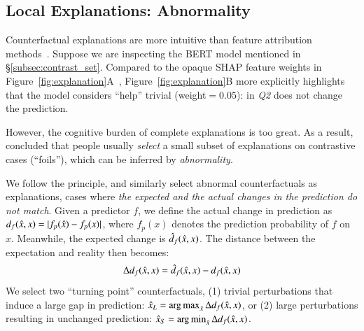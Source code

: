 \subsection{Local Explanations: Abnormality}
Counterfactual explanations are more intuitive than feature attribution methods~\cite{miller}.
Suppose we are inspecting the \qqp BERT model mentioned in \S\ref{subsec:contrast_set}.
Compared to the opaque SHAP feature weights in Figure~\ref{fig:explanation}A~\cite{NIPS2017_7062}, Figure~\ref{fig:explanation}B more explicitly highlights that the model considers ``help'' trivial (weight$=0.05$): 
 in \emph{Q2} does not change the prediction.

However, the cognitive burden of complete explanations is too great.
As a result, \citet{miller} concluded that people usually \emph{select} a small subset of explanations on contrastive cases (``foils''), which can be inferred by \emph{abnormality}.

We follow the principle, and similarly select abnormal counterfactuals as explanations, \ie cases where \emph{the expected and the actual changes in the prediction do not match}.
Given a predictor $f$, we define the actual change in prediction as $d_f(\hat{x}, x)=|f_p(\hat{x})-f_p(x)|$, where $f_p(x)$ denotes the prediction probability of $f$ on $x$.
Meanwhile, the expected change is $\hat{d}_f(\hat{x}, x)$.
The distance between the expectation and reality then becomes:
$$\Delta d_f(\hat{x}, x) = \hat{d}_f(\hat{x}, x)-d_f(\hat{x}, x)$$
We select two ``turning point'' counterfactuals, \ie (1) trivial perturbations that induce a large gap in prediction: $\hat{x}_L = \operatorname*{arg\,max}_{\hat{x}} \Delta d_f(\hat{x}, x)$, or (2) large perturbations resulting in unchanged prediction: $\hat{x}_S = \operatorname*{arg\,min}_{\hat{x}} \Delta d_f(\hat{x}, x)$.



